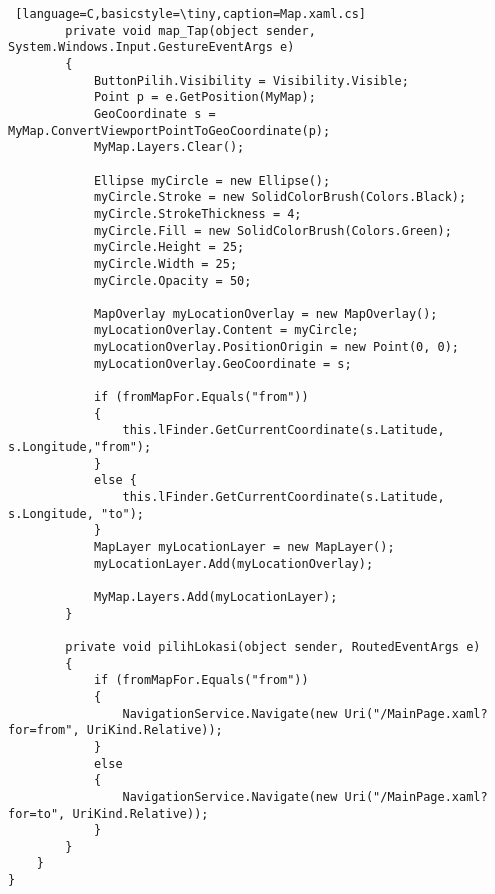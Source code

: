 \begin{lstlisting} [language=C,basicstyle=\tiny,caption=Map.xaml.cs]
        private void map_Tap(object sender, System.Windows.Input.GestureEventArgs e)
        {
            ButtonPilih.Visibility = Visibility.Visible;
            Point p = e.GetPosition(MyMap);
            GeoCoordinate s = MyMap.ConvertViewportPointToGeoCoordinate(p);
            MyMap.Layers.Clear();

            Ellipse myCircle = new Ellipse();
            myCircle.Stroke = new SolidColorBrush(Colors.Black);
            myCircle.StrokeThickness = 4;
            myCircle.Fill = new SolidColorBrush(Colors.Green);
            myCircle.Height = 25;
            myCircle.Width = 25;
            myCircle.Opacity = 50;

            MapOverlay myLocationOverlay = new MapOverlay();
            myLocationOverlay.Content = myCircle;
            myLocationOverlay.PositionOrigin = new Point(0, 0);
            myLocationOverlay.GeoCoordinate = s;

            if (fromMapFor.Equals("from"))
            {
                this.lFinder.GetCurrentCoordinate(s.Latitude, s.Longitude,"from");
            }
            else {
                this.lFinder.GetCurrentCoordinate(s.Latitude, s.Longitude, "to");
            }
            MapLayer myLocationLayer = new MapLayer();
            myLocationLayer.Add(myLocationOverlay);

            MyMap.Layers.Add(myLocationLayer);
        }

        private void pilihLokasi(object sender, RoutedEventArgs e)
        {
            if (fromMapFor.Equals("from"))
            {
                NavigationService.Navigate(new Uri("/MainPage.xaml?for=from", UriKind.Relative));
            }
            else 
            {
                NavigationService.Navigate(new Uri("/MainPage.xaml?for=to", UriKind.Relative));
            }
        }
    }
}
\end{lstlisting}

